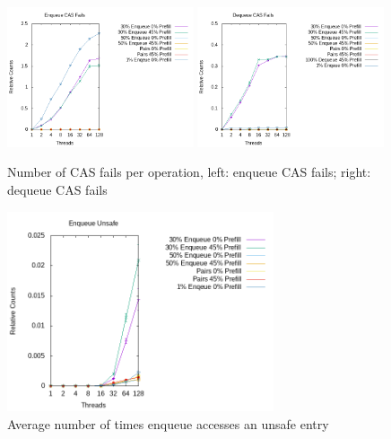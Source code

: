 \documentclass{article}      %
\begin{document}
\begin{figure}[H]
	
	\centering
	\includegraphics[width=0.49\textwidth]{Pictures/diss_enq_cas.png}
	\includegraphics[width=0.49\textwidth]{Pictures/diss_deq_cas.png}
	\caption{Number of CAS fails per operation, left: enqueue CAS fails; right: dequeue CAS fails}
	\label{fig:diss_cas_fails}
\end{figure}

\begin{figure}[H]
	\centering
	\includegraphics[width=0.7\textwidth]{Pictures/diss_enq_unsafe.png}
	\caption{Average number of times enqueue accesses an unsafe entry}
	\label{fig:diss_enq_unsafe}
\end{figure}
\end{document}
